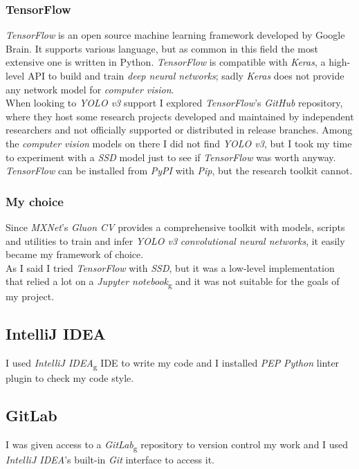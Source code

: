 \subsubsection*{TensorFlow}
\emph{TensorFlow} is an open source machine learning framework developed by Google Brain. It supports various language, but as common in this field the most extensive one is written in Python. \emph{TensorFlow} is compatible with \emph{Keras}, a high-level API to build and train \emph{deep neural networks}; sadly \emph{Keras} does not provide any network model for \emph{computer vision}. \\
When looking to \emph{YOLO v3} support I explored \emph{TensorFlow}'s \emph{GitHub} repository, where they host some research projects developed and maintained by independent researchers and not officially supported or distributed in release branches. Among the \emph{computer vision} models on there I did not find \emph{YOLO v3}, but I took my time to experiment with a \emph{SSD} model just to see if \emph{TensorFlow} was worth anyway. \\
\emph{TensorFlow} can be installed from \emph{PyPI} with \emph{Pip}, but the research toolkit cannot.

\subsubsection*{My choice}
Since \emph{MXNet}'s \emph{Gluon CV} provides a comprehensive toolkit with models, scripts and utilities to train and infer \emph{YOLO v3} \emph{convolutional neural networks}, it easily became my framework of choice. \\
As I said I tried \emph{TensorFlow} with \emph{SSD}, but it was a low-level implementation that relied a lot on a \emph{\gls{Jupyter notebook}}\textsubscript{g} and it was not suitable for the goals of my project.

\subsection*{IntelliJ IDEA}
I used \emph{\gls{IntelliJ IDEA}}\textsubscript{g} IDE to write my code and I installed \emph{PEP} \emph{Python} linter plugin to check my code style. \\


\subsection*{GitLab}
I was given access to a \emph{\gls{GitLab}}\textsubscript{g} repository to version control my work and I used \emph{IntelliJ IDEA}'s built-in \emph{Git} interface to access it.


